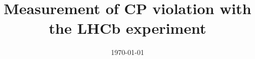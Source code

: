 


\title{Measurement of \texorpdfstring{$\symbf{C\!P}$}{CP} violation with the LHCb experiment}
\date{%
   \today %
}



\maketitle
\thispagestyle{empty}
\tableofcontents
\newpage





\printbibliography{}


